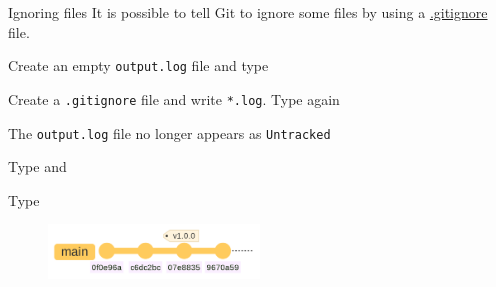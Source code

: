 \documentclass[10pt]{beamer}
\begin{document}
\begin{frame}[fragile]{Ignoring files}
\protect\hypertarget{ignoring-files}{}
It is possible to tell Git to ignore some files by using a
\href{https://git-scm.com/docs/gitignore}{.gitignore} file.

Create an empty \texttt{output.log} file and type 

Create a \texttt{.gitignore} file and write \texttt{*.log}. Type again

The \texttt{output.log} file no longer appears as \texttt{Untracked}

Type  and 

Type 

\begin{figure}[H]

{\centering \includegraphics[width=0.5\textwidth]{mermaid/mermaid-figure-20.png}

}

\end{figure}


\end{frame}
\end{document}
